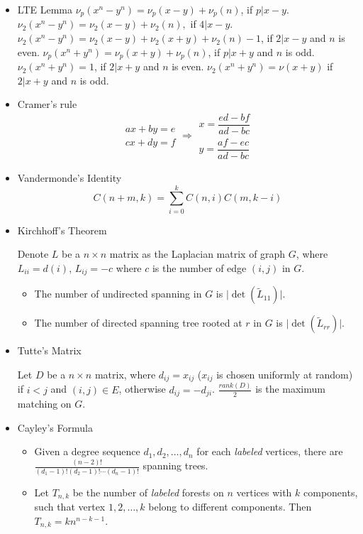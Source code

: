 \begin{itemize}
\item LTE Lemma
$\nu_p(x^n-y^n)=\nu_p(x-y)+\nu_p(n)$, if $p|x-y$.
$\nu_2(x^n-y^n)=\nu_2(x-y)+\nu_2(n),$ if $4|x-y$.
$\nu_2(x^n-y^n)=\nu_2(x-y)+\nu_2(x+y)+\nu_2(n)-1$, if $2|x-y$ and $n$ is even.
$\nu_p(x^n+y^n)=\nu_p(x+y)+\nu_p(n)$, if $p|x+y$ and $n$ is odd.
$\nu_2(x^n+y^n)=1$, if $2|x+y$ and $n$ is even.
$\nu_2(x^n+y^n)=\nu(x+y)$ if $2|x+y$ and $n$ is odd.

\item Cramer's rule
$$
\begin{aligned}ax+by=e\\cx+dy=f\end{aligned}
\Rightarrow
\begin{aligned}x=\dfrac{ed-bf}{ad-bc}\\y=\dfrac{af-ec}{ad-bc}\end{aligned}
$$

\item Vandermonde's Identity
$$
C(n + m, k) = \sum_{i=0}^k C(n, i)C(m, k - i)
$$

\item Kirchhoff's Theorem

Denote $L$ be a $n \times n$ matrix as the Laplacian matrix of graph $G$, where $L_{ii} = d(i)$, $L_{ij} = -c$ where $c$ is the number of edge $(i, j)$ in $G$.
\begin{itemize}
    \item The number of undirected spanning in $G$ is $\lvert \det(\tilde{L}_{11}) \rvert$.
    \item The number of directed spanning tree rooted at $r$ in $G$ is $\lvert \det(\tilde{L}_{rr}) \rvert$.
\end{itemize}

\item Tutte's Matrix

Let $D$ be a $n \times n$ matrix, where $d_{ij} = x_{ij}$ ($x_{ij}$ is chosen uniformly at random) if $i < j$ and $(i, j) \in E$, otherwise $d_{ij} = -d_{ji}$. $\frac{rank(D)}{2}$ is the maximum matching on $G$.

\item Cayley's Formula

\begin{itemize}
  \item Given a degree sequence $d_1, d_2, \ldots, d_n$ for each \textit{labeled} vertices, there are $\frac{(n - 2)!}{(d_1 - 1)!(d_2 - 1)!\cdots(d_n - 1)!}$ spanning trees.
  \item Let $T_{n, k}$ be the number of \textit{labeled} forests on $n$ vertices with $k$ components, such that vertex $1, 2, \ldots, k$ belong to different components. Then $T_{n, k} = kn^{n - k - 1}$.
\end{itemize}


\end{itemize}
